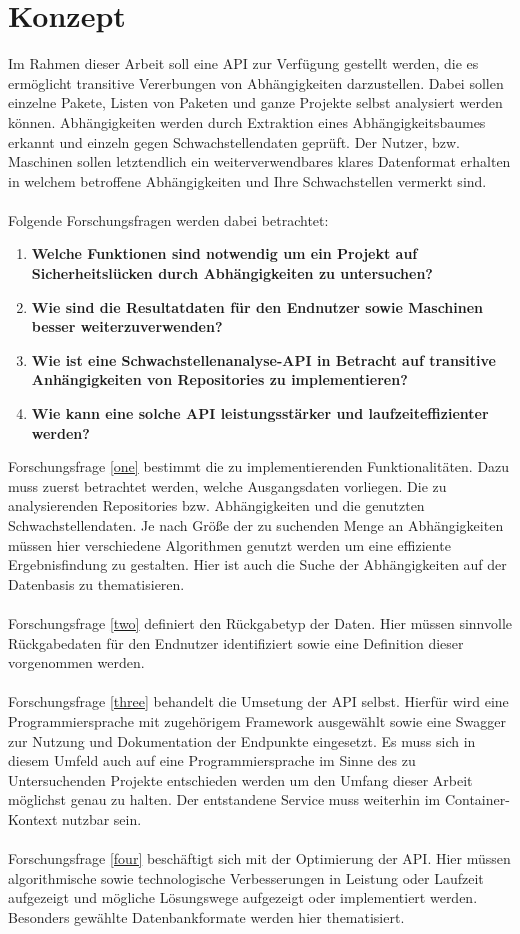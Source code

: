 \section{Konzept} \label{sec:Konzept}
Im Rahmen dieser Arbeit soll eine API zur Verfügung gestellt werden, die es ermöglicht transitive Vererbungen von Abhängigkeiten darzustellen.
Dabei sollen einzelne Pakete, Listen von Paketen und ganze Projekte selbst analysiert werden können.
Abhängigkeiten werden durch Extraktion eines Abhängigkeitsbaumes erkannt und einzeln gegen Schwachstellendaten geprüft.
Der Nutzer, bzw. Maschinen sollen letztendlich ein weiterverwendbares klares Datenformat erhalten in welchem betroffene Abhängigkeiten und Ihre Schwachstellen vermerkt sind.
\\ \\
Folgende Forschungsfragen werden dabei betrachtet:
\begin{enumerate}
    \item \textbf{Welche Funktionen sind notwendig um ein Projekt auf Sicherheitslücken durch Abhängigkeiten zu untersuchen?} \label{one}
    \item \textbf{Wie sind die Resultatdaten für den Endnutzer sowie Maschinen besser weiterzuverwenden?} \label{two}
    \item \textbf{Wie ist eine Schwachstellenanalyse-API in Betracht auf transitive Anhängigkeiten von Repositories zu implementieren?} \label{three}
    \item \textbf{Wie kann eine solche API leistungsstärker und laufzeiteffizienter werden?} \label{four}
\end{enumerate}
Forschungsfrage \ref{one} bestimmt die zu implementierenden Funktionalitäten.
Dazu muss zuerst betrachtet werden, welche Ausgangsdaten vorliegen.
Die zu analysierenden Repositories bzw. Abhängigkeiten und die genutzten Schwachstellendaten.
Je nach Größe der zu suchenden Menge an Abhängigkeiten müssen hier verschiedene Algorithmen genutzt werden um eine effiziente Ergebnisfindung zu gestalten.
Hier ist auch die Suche der Abhängigkeiten auf der Datenbasis zu thematisieren. 
\\ \\
Forschungsfrage \ref{two} definiert den Rückgabetyp der Daten.
Hier müssen sinnvolle Rückgabedaten für den Endnutzer identifiziert sowie eine Definition dieser vorgenommen werden.
\\ \\
Forschungsfrage \ref{three} behandelt die Umsetung der API selbst.
Hierfür wird eine Programmiersprache mit zugehörigem Framework ausgewählt sowie eine Swagger zur Nutzung und Dokumentation der Endpunkte eingesetzt.
Es muss sich in diesem Umfeld auch auf eine Programmiersprache im Sinne des zu Untersuchenden Projekte entschieden werden um den Umfang dieser Arbeit möglichst genau zu halten.
Der entstandene Service muss weiterhin im Container-Kontext nutzbar sein.
\\ \\
Forschungsfrage \ref{four} beschäftigt sich mit der Optimierung der API.
Hier müssen algorithmische sowie technologische Verbesserungen in Leistung oder Laufzeit aufgezeigt und mögliche Lösungswege aufgezeigt oder implementiert werden.
Besonders gewählte Datenbankformate werden hier thematisiert.